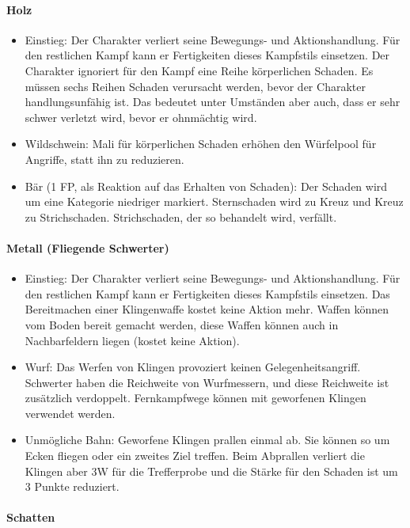 \documentclass{article}
\begin{document}
\paragraph{Holz}

\begin{itemize}
\item Einstieg: Der Charakter verliert seine Bewegungs- und Aktionshandlung. Für den restlichen Kampf kann er Fertigkeiten dieses Kampfstils einsetzen. Der Charakter ignoriert für den Kampf eine Reihe körperlichen Schaden. Es müssen sechs Reihen Schaden verursacht werden, bevor der Charakter handlungsunfähig ist. Das bedeutet unter Umständen aber auch, dass er sehr schwer verletzt wird, bevor er ohnmächtig wird.
\item Wildschwein: Mali für körperlichen Schaden erhöhen den Würfelpool für Angriffe, statt ihn zu reduzieren.
\item Bär (1 FP, als Reaktion auf das Erhalten von Schaden): Der Schaden wird um eine Kategorie niedriger markiert. Sternschaden wird zu Kreuz und Kreuz zu Strichschaden. Strichschaden, der so behandelt wird, verfällt.
\end{itemize}

\paragraph{Metall (Fliegende Schwerter)}

\begin{itemize}
\item Einstieg: Der Charakter verliert seine Bewegungs- und Aktionshandlung. Für den restlichen Kampf kann er Fertigkeiten dieses Kampfstils einsetzen. Das Bereitmachen einer Klingenwaffe kostet keine Aktion mehr. Waffen können vom Boden bereit gemacht werden, diese Waffen können auch in Nachbarfeldern liegen (kostet keine Aktion).
\item Wurf: Das Werfen von Klingen provoziert keinen Gelegenheitsangriff. Schwerter haben die Reichweite von Wurfmessern, und diese Reichweite ist zusätzlich verdoppelt. Fernkampfwege können mit geworfenen Klingen verwendet werden.
\item Unmögliche Bahn: Geworfene Klingen prallen einmal ab. Sie können so um Ecken fliegen oder ein zweites Ziel treffen. Beim Abprallen verliert die Klingen aber 3W für die Trefferprobe und die Stärke für den Schaden ist um 3 Punkte reduziert.
\end{itemize}

\paragraph{Schatten}
\end{document}
